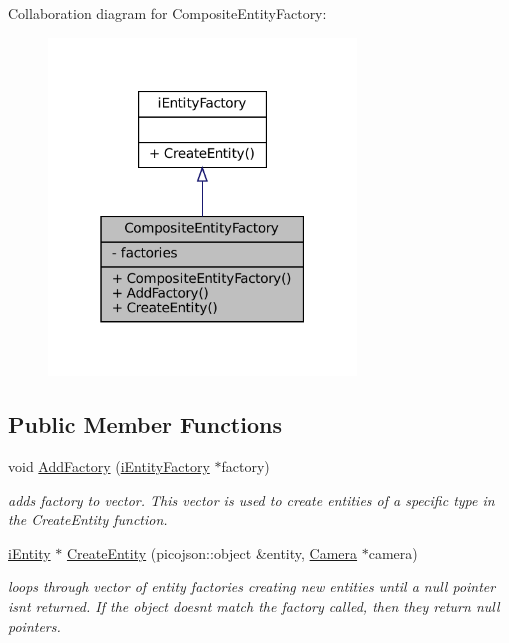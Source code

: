Collaboration diagram for Composite\+Entity\+Factory\+:\nopagebreak
\begin{figure}[H]
\begin{center}
\leavevmode
\includegraphics[width=232pt]{classCompositeEntityFactory__coll__graph}
\end{center}
\end{figure}
\subsection*{Public Member Functions}
\begin{DoxyCompactItemize}
\item 
\mbox{\label{classCompositeEntityFactory_a6ecb6093a839b686c4693bf00713247f}} 
void \hyperlink{classCompositeEntityFactory_a6ecb6093a839b686c4693bf00713247f}{Add\+Factory} (\hyperlink{classiEntityFactory}{i\+Entity\+Factory} $\ast$factory)
\begin{DoxyCompactList}\small\item\em adds factory to vector. This vector is used to create entities of a specific type in the Create\+Entity function. \end{DoxyCompactList}\item 
\mbox{\label{classCompositeEntityFactory_a0f30a9a8443a04f0fa8f17a7bc2f0a58}} 
\hyperlink{classiEntity}{i\+Entity} $\ast$ \hyperlink{classCompositeEntityFactory_a0f30a9a8443a04f0fa8f17a7bc2f0a58}{Create\+Entity} (picojson\+::object \&entity, \hyperlink{classCamera}{Camera} $\ast$camera)
\begin{DoxyCompactList}\small\item\em loops through vector of entity factories creating new entities until a null pointer isn\textquotesingle{}t returned. If the object doesn\textquotesingle{}t match the factory called, then they return null pointers. \end{DoxyCompactList}\end{DoxyCompactItemize}
